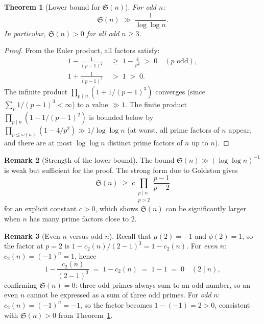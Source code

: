 \documentclass[12pt,a4paper]{amsart}
\newtheorem{theorem}{Theorem}[section]
\theoremstyle{definition}
\newtheorem{remark}[theorem]{Remark}
\begin{document}
\begin{theorem}[Lower bound for $\mathfrak{S}(n)$]\label{thm:sing_lower}
  For odd $n$:
  \[
    \mathfrak{S}(n) \;\gg\; \frac{1}{\log\log n}.
  \]
  In particular, $\mathfrak{S}(n) > 0$ for all odd $n \geq 3$.
\end{theorem}

\begin{proof}
  From the Euler product, all factors satisfy:
  \begin{align*}
    1 - \frac{1}{(p-1)^2} &\;\geq\; 1 - \frac{4}{p^2} \;>\; 0 \quad (p \text{ odd}), \\
    1 + \frac{1}{(p-1)^3} &\;>\; 1 \;>\; 0.
  \end{align*}
  The infinite product $\prod_{p \nmid n}(1 + 1/(p-1)^3)$ converges
  (since $\sum_p 1/(p-1)^3 < \infty$) to a value $\gg 1$.
  The finite product $\prod_{p \mid n}(1 - 1/(p-1)^2)$ is bounded below
  by $\prod_{p \leq \omega(n)} (1 - 4/p^2) \gg 1/\log\log n$
  (at worst, all prime factors of $n$ appear, and there are at most
  $\log\log n$ distinct prime factors of $n$ up to $n$).
\end{proof}

\begin{remark}[Strength of the lower bound]
  The bound $\mathfrak{S}(n) \gg (\log\log n)^{-1}$ is weak but sufficient
  for the proof.  The strong form due to Goldston gives
  \[
    \mathfrak{S}(n) \;\geq\; c \prod_{\substack{p \mid n \\ p > 2}} \frac{p-1}{p-2}
  \]
  for an explicit constant $c > 0$, which shows $\mathfrak{S}(n)$ can be
  significantly larger when $n$ has many prime factors close to $2$.
\end{remark}

\begin{remark}[Even $n$ versus odd $n$]
  Recall that $\mu(2) = -1$ and $\phi(2) = 1$, so the factor at $p=2$ is
  $1 - c_2(n)/(2-1)^3 = 1 - c_2(n)$.  For \emph{even} $n$:
  $c_2(n) = (-1)^n = 1$, hence
  \[
    1 - \frac{c_2(n)}{(2-1)^3} \;=\; 1 - c_2(n) \;=\; 1 - 1 \;=\; 0
    \quad (2 \mid n),
  \]
  confirming $\mathfrak{S}(n) = 0$: three odd primes always sum to an odd
  number, so an even $n$ cannot be expressed as a sum of three odd primes.
  For \emph{odd} $n$: $c_2(n) = (-1)^n = -1$, so the factor becomes
  $1 - (-1) = 2 > 0$, consistent with $\mathfrak{S}(n) > 0$ from
  Theorem~\ref{thm:sing_lower}.
\end{remark}

\end{document}
